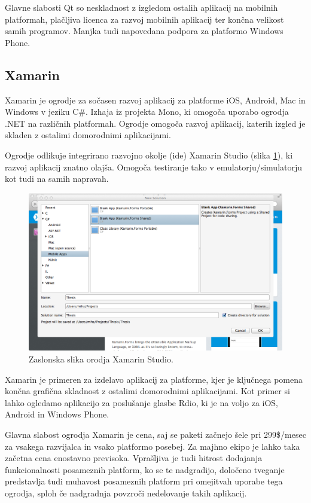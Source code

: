 Glavne slabosti Qt so neskladnost z izgledom ostalih aplikacij na mobilnih platformah, plačljiva licenca za razvoj mobilnih aplikacij ter končna velikost samih programov. Manjka tudi napovedana podpora za platformo Windows Phone.

\subsection{Xamarin}

Xamarin\cite{xamarin} je ogrodje za sočasen razvoj aplikacij za platforme iOS, Android, Mac in Windows v jeziku C\#. Izhaja iz projekta Mono\cite{mono}, ki omogoča uporabo ogrodja .NET\cite{dotnet} na različnih platformah. Ogrodje omogoča razvoj aplikacij, katerih izgled je skladen z ostalimi domorodnimi aplikacijami.

Ogrodje odlikuje integrirano razvojno okolje (\gls{ide}) Xamarin Studio (slika \ref{fig:xamarin}), ki razvoj aplikacij znatno olajša. Omogoča testiranje tako v emulatorju/simulatorju kot tudi na samih napravah.

\begin{figure}
 \includegraphics[width=\linewidth]{xamarin}
 \caption{Zaslonska slika orodja Xamarin Studio.}
 \label{fig:xamarin}
\end{figure}

Xamarin je primeren za izdelavo aplikacij za platforme, kjer je ključnega pomena končna grafična skladnost z ostalimi domorodnimi aplikacijami. Kot primer si lahko ogledamo aplikacijo za poslušanje glasbe Rdio\cite{rdio}, ki je na voljo za iOS, Android in Windows Phone.

Glavna slabost ogrodja Xamarin je cena, saj se paketi začnejo šele pri 299\$/mesec za vsakega razvijalca in vsako platformo posebej. Za majhno ekipo je lahko taka začetna cena enostavno previsoka. Vprašljiva je tudi hitrost dodajanja funkcionalnosti posameznih platform, ko se te nadgradijo, določeno tveganje predstavlja tudi muhavost posameznih platform pri omejitvah uporabe tega ogrodja, sploh če nadgradnja povzroči nedelovanje takih aplikacij.

